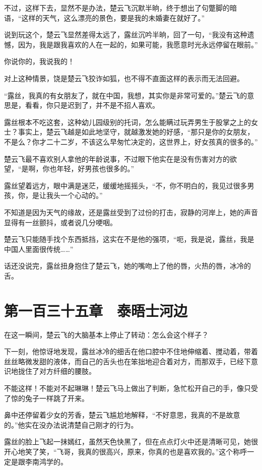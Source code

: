 不过，这样下去，显然不是办法，楚云飞沉默半晌，终于想出了句蹩脚的暗语，“这样的天气，这么漂亮的景色，要是我的未婚妻在就好了。”

说到玩这个，楚云飞显然差得太远了，露丝沉吟半晌，回了一句，“我没有这种遗憾，因为，我是跟我喜欢的人在一起的，如果可能，我愿意时光永远停留在眼前。”

你说你的，我说我的！

对上这种情景，饶是楚云飞狡诈如狐，也不得不直面这样的表示而无法回避。

“露丝，我真的有女朋友了，就在中国，我想，其实你是非常可爱的。”楚云飞的意思是，看看，你只是迟到了，并不是不招人喜欢。

露丝根本不吃这套，这种幼儿园级别的托词，怎么能瞒过玩弄男生于股掌之上的女士？事实上，楚云飞越是如此地坚守，就越激发她的好感，“那只是你的女朋友，不是么？你才二十二岁，不该这么早匆忙决定的，这世界上，好女孩真的很多的。”

楚云飞最不喜欢别人拿他的年龄说事，不过眼下他实在是没有伤害对方的欲望，“是啊，你也年轻，好男孩也很多的。”

露丝望着远方，眼中满是迷茫，缓缓地摇摇头，“不，你不明白的，我见过很多男孩，你，是让我头一个心动的。”

不知道是因为天气的缘故，还是露丝受到了过份的打击，寂静的河岸上，她的声音显得有一丝颤抖，或者说几分哽咽。

楚云飞只能随手找个东西抵挡，这实在不是他的强项，“呃，我是说，露丝，我是中国人里面很传统……”

话还没说完，露丝扭身抱住了楚云飞，她的嘴吻上了他的唇，火热的唇，冰冷的舌。

\section{第一百三十五章　泰晤士河边}

在这一瞬间，楚云飞的大脑基本上停止了转动：怎么会这个样子？

下一刻，他惊讶地发现，露丝冰冷的细舌在他口腔中不住地伸缩着、搅动着，带着丝丝略微发甜的液体，而自己的舌头也在笨拙地迎合着对方，而那双手，已经下意识地拢住了对方纤细的腰肢。

不能这样！不能对不起琳琳！楚云飞马上做出了判断，急忙松开自己的手，像只受了惊的兔子一样跳了开来。

鼻中还停留着少女的芳香，楚云飞尴尬地解释，“不好意思，我真的不是故意的。”他实在没办法说清楚自己刚才的行为。

露丝的脸上飞起一抹嫣红，虽然天色快黑了，但在点点灯火中还是清晰可见，她很开心地笑了笑，“飞哥，我真的很高兴，原来，你真的也是喜欢我的。”这个称呼一定是跟李南鸿学的。

